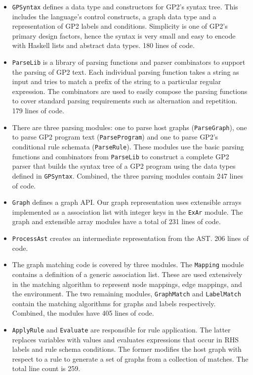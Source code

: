 \begin{itemize}
\item \texttt{GPSyntax} defines a data type and constructors for GP2's syntax tree. This includes the language's control constructs, a graph data type and a representation of GP2 labels and conditions. Simplicity is one of GP2's primary design factors, hence the syntax is very small and easy to encode with Haskell lists and abstract data types. 180 lines of code.
\item \texttt{ParseLib} is a library of parsing functions and parser combinators to support the parsing of GP2 text. Each individual parsing function takes a string as input and tries to match a prefix of the string to a particular regular expression. The combinators are used to easily compose the parsing functions to cover standard parsing requirements such as alternation and repetition. 179 lines of code.
\item There are three parsing modules: one to parse host graphs (\texttt{ParseGraph}), one to parse GP2 program text (\texttt{ParseProgram}) and one to parse GP2's conditional rule schemata (\texttt{ParseRule}). These modules use the basic parsing functions and combinators from \texttt{ParseLib} to construct a complete GP2 parser that builds the syntax tree of a GP2 program using the data types defined in \texttt{GPSyntax}. Combined, the three parsing modules contain 247 lines of code.
\item \texttt{Graph} defines a graph API. Our graph representation uses extensible arrays implemented as a association list with integer keys in the \texttt{ExAr} module. The graph and extensible array modules have a total of 231 lines of code.
\item \texttt{ProcessAst} creates an intermediate representation from the AST. 206 lines of code.
\item The graph matching code is covered by three modules. The \texttt{Mapping} module contains a definition of a generic association list. These are used extensively in the matching algorithm to represent node mappings, edge mappings, and the environment. The two remaining modules, \texttt{GraphMatch} and \texttt{LabelMatch} contain the matching algorithms for graphs and labels respectively. Combined, the modules have 405 lines of code.
\item \texttt{ApplyRule} and \texttt{Evaluate} are responsible for rule application. The latter replaces variables with values and evaluates expressions that occur in RHS labels and rule schema conditions. The former modifies the host graph with respect to a rule to generate a set of graphs from a collection of matches. The total line count is 259.

\end{itemize}
